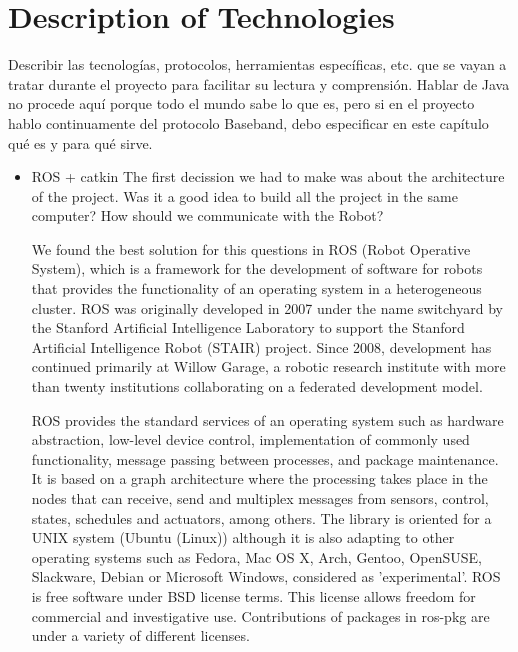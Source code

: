 \chapter{Description of Technologies}
	Describir las tecnologías, protocolos, herramientas específicas, etc. que se vayan a tratar durante el proyecto para facilitar su lectura y comprensión.
	Hablar de Java no procede aquí porque todo el mundo sabe lo que es, pero si en el proyecto hablo continuamente del protocolo Baseband, debo especificar en este capítulo qué es y para qué sirve.

	\begin{itemize}
	\item[\textendash]ROS + catkin  %
			The first decission we had to make was about the architecture of the project. Was it a good idea to build all the project in the same computer? How should we communicate with the Robot?

		We found the best solution for this questions in ROS (Robot Operative System), which is a framework for the development of software for robots that provides the functionality of an operating system in a heterogeneous cluster. ROS was originally developed in 2007 under the name switchyard by the Stanford Artificial Intelligence Laboratory to support the Stanford Artificial Intelligence Robot (STAIR) project. Since 2008, development has continued primarily at Willow Garage, a robotic research institute with more than twenty institutions collaborating on a federated development model.

		ROS provides the standard services of an operating system such as hardware abstraction, low-level device control, implementation of commonly used functionality, message passing between processes, and package maintenance. It is based on a graph architecture where the processing takes place in the nodes that can receive, send and multiplex messages from sensors, control, states, schedules and actuators, among others. The library is oriented for a UNIX system (Ubuntu (Linux)) although it is also adapting to other operating systems such as Fedora, Mac OS X, Arch, Gentoo, OpenSUSE, Slackware, Debian or Microsoft Windows, considered as 'experimental'.
		ROS is free software under BSD license terms. This license allows freedom for commercial and investigative use. Contributions of packages in ros-pkg are under a variety of different licenses.


\end{itemize}
